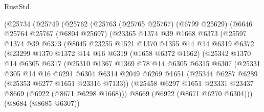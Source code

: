 \begin{lexlean}{RustStd}
\begin{coremodule}
            (@25734
              (@25749
                (@25762
                  (@25763
                    (@25765 @25767)
                    (@6799 @25629)
                    (@6646
                      @25764
                      @25767
                      (@6804 @25697)
                      (@23365
                        @1374
                        @39
                        @1668
                        @6373
                        (@25597
                          @1374
                          @39
                          @6373
                          (@8045
                            @23255
                            @1521
                            @1370
                            @1355
                            @14
                            @14
                            @6319
                            @6372
                            (@23299
                              @1370
                              @1372
                              @14
                              @16
                              @6319
                              (@1658 @6372 @1662)
                              (@25342
                                @1370
                                @14
                                @6305
                                @6317
                                (@25310
                                  @1367
                                  @1369
                                  @78
                                  @14
                                  @6305
                                  @6315
                                  @6307
                                  (@25331
                                    @305
                                    @14
                                    @16
                                    @6291
                                    @6304
                                    @6314
                                    @2049
                                    @6269
                                    @1651
                                    (@25344 @6287 @6289 (@25353 @6277 @1651 @23316 @7133))
                                    (@25458
                                      @6297
                                      @1651
                                      @23331
                                      @23437
                                      @8669
                                      (@6922 (@8671 @6298 @1668)))
                                    @8669
                                    (@6922 (@8671 @6270 @6304)))
                                  (@8684 (@8685 @6307))

\end{coremodule}
\end{lexlean}
